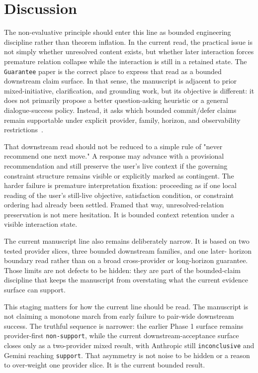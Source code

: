 \documentclass[11pt]{article}
\begin{document}
\section{Discussion}

The non-evaluative principle should enter this line as bounded engineering
discipline rather than theorem inflation. In the current read, the practical issue
is not simply whether unresolved content exists, but whether later interaction
forces premature relation collapse while the interaction is still in a retained
state. The \texttt{Guarantee} paper is the correct place to express that read as
a bounded downstream claim surface. In that sense, the manuscript is adjacent to
prior mixed-initiative, clarification, and grounding work, but its objective is
different: it does not primarily propose a better question-asking heuristic or a
general dialogue-success policy. Instead, it asks which bounded commit/defer
claims remain supportable under explicit provider, family, horizon, and
observability restrictions~\cite{chucarroll2000mimic,deboni2003clarification,rao2018evpi,benotti2021grounding,sahay-etal-2025-ask,wen-etal-2025-know,madhusudhan-etal-2025-llms}.

That downstream read should not be reduced to a simple rule of "never recommend
one next move." A response may advance with a provisional recommendation and
still preserve the user's live context if the governing constraint structure
remains visible or explicitly marked as contingent. The harder failure is
premature interpretation fixation: proceeding as if one local reading of the
user's still-live objective, satisfaction condition, or constraint ordering had
already been settled. Framed that way, unresolved-relation preservation is not
mere hesitation. It is bounded context retention under a visible interaction
state.

The current manuscript line also remains deliberately narrow. It is based on
two tested provider slices, three bounded downstream families, and one later-
horizon boundary read rather than on a broad cross-provider or long-horizon
guarantee. Those limits are not defects to be hidden: they are part of the
bounded-claim discipline that keeps the manuscript from overstating what the
current evidence surface can support.

This staging matters for how the current line should be read. The manuscript is
not claiming a monotone march from early failure to pair-wide downstream
success. The truthful sequence is narrower: the earlier Phase 1 surface remains
provider-first \texttt{non-support}, while the current downstream-acceptance
surface closes only as a two-provider mixed result, with Anthropic still
\texttt{inconclusive} and Gemini reaching \texttt{support}. That asymmetry is
not noise to be hidden or a reason to over-weight one provider slice. It is the
current bounded result.
\end{document}

